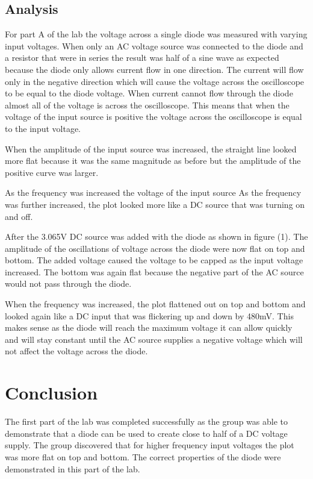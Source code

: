 \documentclass[twocolumn, amsmath]{revtex4}
\begin{document}



 
\subsection{Analysis}
For part A of the lab the voltage across a single diode was measured with varying input voltages. When only an AC voltage source was connected to the diode and a resistor that were in series the result was half of a sine wave as expected because the diode only allows current flow in one direction. The current will flow only in the negative direction which will cause the voltage across the oscilloscope to be equal to the diode voltage. When current cannot flow through the diode almost all of the voltage is across the oscilloscope. This means that when the voltage of the input source is positive the voltage across the oscilloscope is equal to the input voltage. 

When the amplitude of the input source was increased, the straight line looked more flat because it was the same magnitude as before but the amplitude of the positive curve was larger.

As the frequency was increased the voltage of the input source As the frequency was further increased, the plot looked more like a DC source that was turning on and off.

After the 3.065V DC source was added with the diode as shown in figure (1). The amplitude of the oscillations of voltage across the diode were now flat on top and bottom. The added voltage caused the voltage to be capped as the input voltage increased. The bottom was again flat because the negative part of the AC source would not pass through the diode.

When the frequency was increased, the plot flattened out on top and bottom and looked again like a DC input that was flickering up and down by 480mV. This makes sense as the diode will reach the maximum voltage it can allow quickly and will stay  constant until the AC source supplies a negative voltage which will not affect the voltage across the diode.






\section{Conclusion}
The first part of the lab was completed successfully as the group was able to demonstrate that a diode can be used to create close to half of a DC voltage supply. The group discovered that for higher frequency input voltages the plot was more flat on top and bottom. The correct properties of the diode were demonstrated in this part of the lab.
\end{document}
